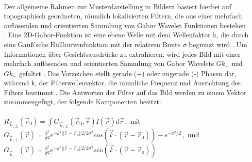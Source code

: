 \documentclass[12pt,a4paper,headinclude,twoside, plainheadsepline, open=right,numbers=noenddot]{scrreprt}
\begin{document}
\paragraph{}
Der allgemeine Rahmen zur Musterdarstellung in Bildern basiert hierbei auf topographisch geordneten, räumlich lokalisierten Filtern, die aus einer mehrfach auflösenden und orientierten Sammlung von Gabor Wavelet Funktionen bestehen \cite{Lyons1998CodingFacialExpressionsWithGaborWavelets}.
Eine 2D-Gabor-Funktion ist eine ebene Welle mit dem Wellenfaktor k, die durch eine Gauß'sche Hüllkurvenfunktion mit der relativen Breite $\sigma$ begrenzt wird \cite{Shishir2008RecognitionofFacialExpression}.
Um Informationen über Gesichtsausdrücke zu extrahieren, wird jedes Bild mit einer mehrfach auflösenden und orientierten Sammlung von Gabor Wavelets $Gk_+$ und $Gk_-$ gefaltet \cite{Lyons1998CodingFacialExpressionsWithGaborWavelets}. Das Vorzeichen stellt gerade (+) oder ungerade (-) Phasen dar, während k, der Filterwellenvektor, die räumliche Frequenz und Ausrichtung des Filters bestimmt \cite{Lyons1998CodingFacialExpressionsWithGaborWavelets}. Die Antworten der Filter auf das Bild werden zu einem Vektor zusammengefügt, der folgende Komponenten besitzt:
\paragraph{}
$R_{\vec{k},\pm}(\vec{r}_0) = \int G_{\vec{k},\pm} (\vec{r}_0, \vec{r}) I (\vec{r})d\vec{r}$\,,\, mit \\ 

$G_{\vec{k},+}(\vec{r}) = \frac{k^2}{\sigma^2} e^{-k^2||\vec{r}-\vec{r}_0||2/2\sigma^2}cos(\vec{k}\cdot(\vec{r}-\vec{r}_0))-e^{-\sigma^2/2}$\,,\, und \\ 

$G_{\vec{k},-}(\vec{r}) = \frac{k^2}{\sigma^2} e^{-k^2||\vec{r}-\vec{r}_0||2/2\sigma^2}sin(\vec{k}\cdot(\vec{r}-\vec{r}_0))$ \\
\cite{Lyons1998CodingFacialExpressionsWithGaborWavelets}
\end{document}

